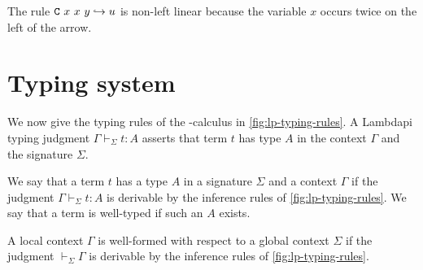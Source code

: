 \begin{example}
The rule $\texttt{\upshape{C}}~x~x~y\hookrightarrow u$ is non-left linear because the variable $x$ occurs twice on the left of the arrow.
\end{example}

\section{Typing system}
\label{sect:lambdapi-typing}

We now give the typing rules of the \lpm{}-calculus in \cref{fig:lp-typing-rules}.
A Lambdapi typing judgment  $\Gamma \vdash_\Sigma t : A$ \index{$\vdash$} asserts that term $t$ has type $A$ in the context $\Gamma$ and the signature $\Sigma$.


\begin{definition}
We say that a term $t$ has a type $A$ in a signature $\Sigma$ and a context $\Gamma$ if the judgment $\Gamma \vdash_\Sigma t: A$ is
derivable by the inference rules of \cref{fig:lp-typing-rules}. We say that a term is well-typed  if such an $A$ exists.
\end{definition}

\begin{definition}
A local context $\Gamma$ is well-formed  with respect to a global context $\Sigma$ if the judgment $\vdash_\Sigma \Gamma$ is derivable by the inference rules of \cref{fig:lp-typing-rules}.
\end{definition}


